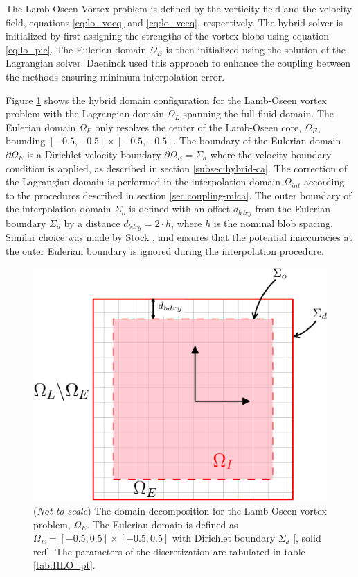 The Lamb-Oseen Vortex problem is defined by the vorticity field and the velocity field, equations \ref{eq:lo_voeq} and \ref{eq:lo_veeq}, respectively. The hybrid solver is initialized by first assigning the strengths of the vortex blobs using equation \ref{eq:lo_pie}. The Eulerian domain $\Omega_E$ is then initialized using the solution of the Lagrangian solver. Daeninck \cite{Daeninck2006} used this approach to enhance the coupling between the methods ensuring minimum interpolation error.

Figure \ref{fig:HLO_dc} shows the hybrid domain configuration for the Lamb-Oseen vortex problem with the Lagrangian domain $\Omega_L$ spanning the full fluid domain. The Eulerian domain $\Omega_E$ only resolves the center of the Lamb-Oseen core, $\Omega_E$, bounding $[-0.5,-0.5] \times [-0.5,-0.5]$. The boundary of the Eulerian domain $\partial \Omega_E$ is a Dirichlet velocity boundary $\partial \Omega_E = \Sigma_d$ where the velocity boundary condition is applied, as described in section \ref{subsec:hybrid-ca}. The correction of the Lagrangian domain is performed in the interpolation domain $\Omega_{int}$ according to the procedures described in section \ref{sec:coupling-mlca}. The outer boundary of the interpolation domain $\Sigma_{o}$ is defined with an offset $d_{bdry}$ from the Eulerian boundary $\Sigma_d$ by a distance $d_{bdry} = 2\cdot h$, where $h$ is the nominal blob spacing. Similar choice was made by Stock \cite{Stock2010a}, and ensures that the potential inaccuracies at the outer Eulerian boundary is ignored during the interpolation procedure.  

	\begin{figure}[!t]
	\centering
	\includegraphics[width=0.5\linewidth]{./figures/validation/lambOseen/hlo_dd-crop.pdf}
	\caption{(\textit{Not to scale}) The domain decomposition for the Lamb-Oseen vortex problem, $\Omega_E$. The Eulerian domain is defined as $\Omega_E = [-0.5,0.5]\times[-0.5,0.5]$ with Dirichlet boundary $\Sigma_d$ [{\color{plotRed}{---}}, solid red]. The parameters of the discretization are tabulated in table \ref{tab:HLO_pt}.}
	\label{fig:HLO_dc}
	\end{figure}

